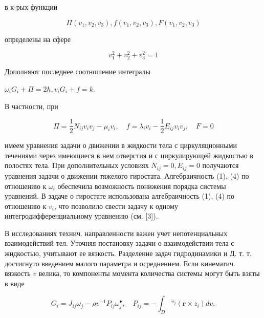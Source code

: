\documentclass[10pt]{article}
\begin{document}
в к-рых функции



\[

\Pi\left(v_{1}, v_{2}, v_{3}\right), f\left(v_{1}, v_{2}, v_{3}\right), F\left(v_{1}, v_{2}, v_{3}\right)

\]



определены на сфере



\[

v_{1}^{2}+v_{2}^{2}+v_{3}^{2}=1

\]



Дополняют последнее соотношение интегралы



$\omega_{i} G_{i}+\Pi=2 h, v_{i} G_{i}+f=k$.



В частности, при



\[

\Pi=\frac{1}{2} N_{i j} v_{i} v_{j}-\mu_{i} v_{i}, \quad f=\lambda_{i} v_{i}-\frac{1}{2} E_{i j} v_{i} v_{j}, \quad F=0

\]



имеем уравнения задачи о движении в жидкости тела с циркуляционными течениями через имеющиеся в нем отверстия и с циркулирующей жидкостью в полостях тела. При дополнительных условиях $N_{i j}=0, E_{i j}=0$ получаются уравнения задачи о движении тяжелого гиростата. Алгебраичность (1), (4) по отношению к $\omega_{i}$ обеспечила возможность понижения порядка системы уравнений. В задаче о гиростате использована алгебраичность (1), (4) по отношению к $v_{i}$, что позволило свести задачу к одному интегродифференциальному уравнению (см. [3]).



В исследованиях технич. направленности важен учет непотенциальных взаимодействий тел. Уточняя постановку задачи о взаимодействии тела с жидкостью, учитывают ее вязкость. Разделение задач гидродинамики и Д. т. т. достигнуто введением малого параметра и осреднением. Если кинематич. вязкость $v$ велика, то компоненты момента количества системы могут быть взяты в виде



\[

G_{i}=J_{i j} \omega_{j}-\rho v^{-1} P_{i j} \omega_{j}^{\bullet}, \quad P_{i j}=-\int_{D}{ }^{\ni_{j}}\left(\boldsymbol{r} \times z_{i}\right) d v,

\]
\end{document}

